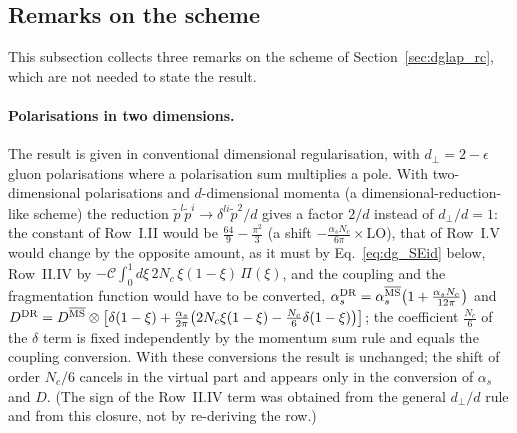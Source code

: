 \subsection{Remarks on the scheme}\label{app:scheme}

This subsection collects three remarks on the scheme of Section~\ref{sec:dglap_rc}, which are not needed to state the result.

\paragraph{Polarisations in two dimensions.} The result is given in conventional dimensional regularisation, with $d_\perp=2-\epsilon$ gluon polarisations where a polarisation sum multiplies a pole. With two-dimensional polarisations and $d$-dimensional momenta (a dimensional-reduction-like scheme) the reduction $\tilde p^l\tilde p^i\to\delta^{li}\tilde p^2/d$ gives a factor $2/d$ instead of $d_\perp/d=1$: the constant of Row~I.II would be $\frac{64}{9}-\frac{\pi^2}{3}$ (a shift $-\frac{\alpha_sN_c}{6\pi}\times$LO), that of Row~I.V would change by the opposite amount, as it must by Eq.~\eqref{eq:dg_SEid} below, Row~II.IV by $-\mathcal C\int_0^1d\xi\,2N_c\,\xi(1-\xi)\,\Pi(\xi)$, and the coupling and the fragmentation function would have to be converted, $\alpha_s^{\rm DR}=\alpha_s^{\overline{\rm MS}}\big(1+\frac{\alpha_sN_c}{12\pi}\big)$ and $D^{\rm DR}=D^{\overline{\rm MS}}\otimes\big[\delta(1-\xi)+\frac{\alpha_s}{2\pi}\big(2N_c\xi(1-\xi)-\frac{N_c}{6}\delta(1-\xi)\big)\big]$; the coefficient $\frac{N_c}{6}$ of the $\delta$ term is fixed independently by the momentum sum rule and equals the coupling conversion. With these conversions the result is unchanged; the shift of order $N_c/6$ cancels in the virtual part and appears only in the conversion of $\alpha_s$ and $D$. (The sign of the Row~II.IV term was obtained from the general $d_\perp/d$ rule and from this closure, not by re-deriving the row.)

